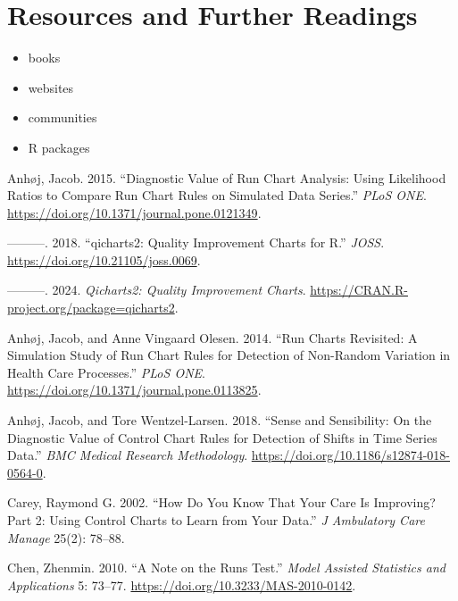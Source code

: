 \documentclass[
]{book}
\providecommand{\tightlist}{%
  \setlength{\itemsep}{0pt}\setlength{\parskip}{0pt}}
\newlength{\cslhangindent}
\newenvironment{CSLReferences}[2] %
 {\begin{list}{}{%
  \setlength{\itemindent}{0pt}
  \setlength{\leftmargin}{0pt}
  \setlength{\parsep}{0pt}
  \ifodd #1
   \setlength{\leftmargin}{\cslhangindent}
   \setlength{\itemindent}{-1\cslhangindent}
  \fi
  \setlength{\itemsep}{#2\baselineskip}}}
 {\end{list}}
\begin{document}
\chapter{Resources and Further Readings}\label{resources}

\begin{itemize}
\tightlist
\item
  books
\item
  websites
\item
  communities
\item
  R packages
\end{itemize}

\label{refs}
\begin{CSLReferences}{1}{0}
Anhøj, Jacob. 2015. {``Diagnostic Value of Run Chart Analysis: Using Likelihood Ratios to Compare Run Chart Rules on Simulated Data Series.''} \emph{PLoS ONE}. \url{https://doi.org/10.1371/journal.pone.0121349}.

---------. 2018. {``{q}icharts2: Quality Improvement Charts for {R}.''} \emph{JOSS}. \url{https://doi.org/10.21105/joss.0069}.

---------. 2024. \emph{Qicharts2: Quality Improvement Charts}. \url{https://CRAN.R-project.org/package=qicharts2}.

Anhøj, Jacob, and Anne Vingaard Olesen. 2014. {``Run Charts Revisited: A Simulation Study of Run Chart Rules for Detection of Non-Random Variation in Health Care Processes.''} \emph{PLoS ONE}. \url{https://doi.org/10.1371/journal.pone.0113825}.

Anhøj, Jacob, and Tore Wentzel-Larsen. 2018. {``Sense and Sensibility: On the Diagnostic Value of Control Chart Rules for Detection of Shifts in Time Series Data.''} \emph{BMC Medical Research Methodology}. \url{https://doi.org/10.1186/s12874-018-0564-0}.

Carey, Raymond G. 2002. {``How Do You Know That Your Care Is Improving? Part 2: Using Control Charts to Learn from Your Data.''} \emph{J Ambulatory Care Manage} 25(2): 78--88.

Chen, Zhenmin. 2010. {``A Note on the Runs Test.''} \emph{Model Assisted Statistics and Applications} 5: 73--77. \url{https://doi.org/10.3233/MAS-2010-0142}.


\end{CSLReferences}
\end{document}
